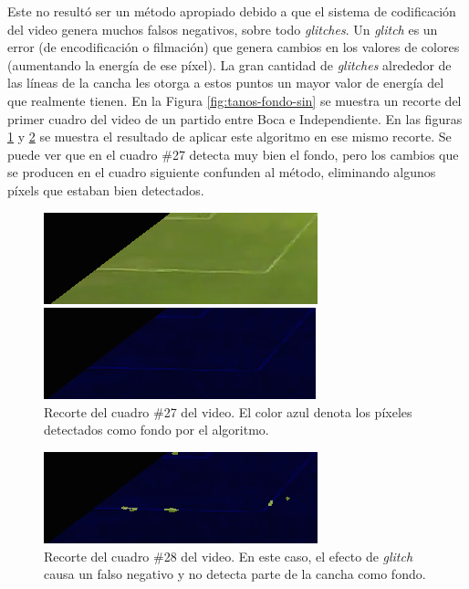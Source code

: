 Este no resultó ser un método apropiado debido a que el sistema de codificación
del video genera muchos falsos negativos, sobre todo \textit{glitches}. Un
\textit{glitch} es un error (de encodificación o filmación) que genera cambios
en los valores de colores (aumentando la energía de ese píxel). La gran
cantidad de \textit{glitches} alrededor de las líneas de la cancha les otorga a
estos puntos un mayor valor de energía del que realmente tienen. En la Figura
\ref{fig:tanos-fondo-sin} se muestra un recorte del primer cuadro del video de
un partido entre Boca e Independiente. En las figuras \ref{fig:tanos-fondo} y
\ref{fig:tanos-fondo-broken} se muestra el resultado de aplicar este algoritmo
en ese mismo recorte. Se puede ver que en el cuadro \#27 detecta muy bien el
fondo, pero los cambios que se producen en el cuadro siguiente confunden al
método, eliminando algunos píxels que estaban bien detectados.

\begin{figure}[H]
  \centering
    \begin{minipage}[t]{.45\textwidth}
      \includegraphics[width=\linewidth]{./images/tanos-fondo-f1.png}
      \caption{Recorte del cuadro \#1 del video del partido entre Boca e Independiente
      \label{fig:tanos-fondo-sin}}
    \end{minipage}
    \begin{minipage}[t]{.45\textwidth}
      \includegraphics[width=\linewidth]{./images/tanos-fondo-f27.png}
      \caption{Recorte del cuadro \#27 del video. El color azul denota los píxeles detectados como fondo por el algoritmo.
      \label{fig:tanos-fondo}}
    \end{minipage}
  \end{figure}
  \begin{figure}[H]
  \centering
    \includegraphics[width=.45\linewidth]{./images/tanos-fondo-f28.png}
    \caption{Recorte del cuadro \#28 del video. En este caso, el efecto de \textit{glitch} causa un falso negativo y no detecta parte de la cancha como fondo.}
    \label{fig:tanos-fondo-broken}
\end{figure}

